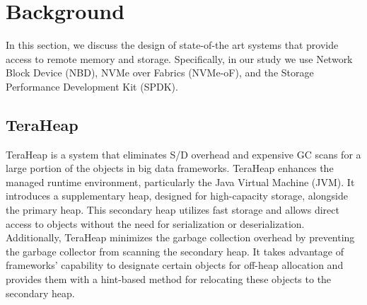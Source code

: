 \section{Background}

In this section, we discuss the design of state-of-the art systems that provide
access to remote memory and storage. Specifically, in our study we use Network
Block Device (NBD), NVMe over Fabrics (NVMe-oF), and the Storage Performance
Development Kit (SPDK).

\vspace{1em}
\subsection{TeraHeap}
TeraHeap is a system that eliminates S/D overhead and expensive GC scans for a
large portion of the objects in big data frameworks. TeraHeap enhances the
managed runtime environment, particularly the Java Virtual Machine (JVM). It
introduces a supplementary heap, designed for high-capacity storage, alongside
the primary heap. This secondary heap utilizes fast storage and allows direct
access to objects without the need for serialization or deserialization.
Additionally, TeraHeap minimizes the garbage collection overhead by preventing
the garbage collector from scanning the secondary heap. It takes advantage of
frameworks' capability to designate certain objects for off-heap allocation and
provides them with a hint-based method for relocating these objects to the
secondary heap. 

